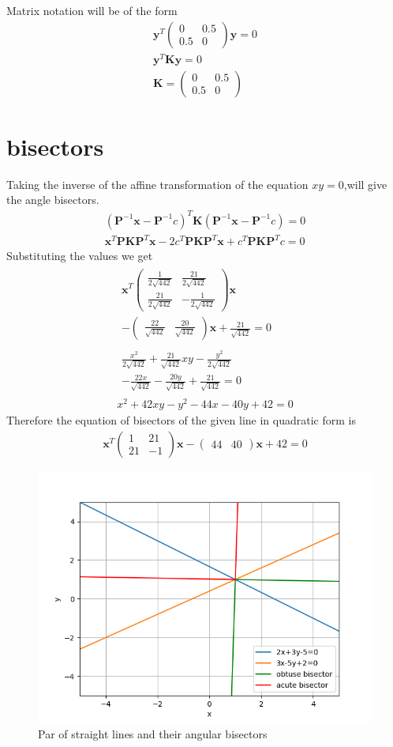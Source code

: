\documentclass[journal,12pt,twocolumn]{IEEEtran}
\providecommand{\brak}[1]{\ensuremath{\left(#1\right)}}
\newcommand{\myvec}[1]{\ensuremath{\begin{pmatrix}#1\end{pmatrix}}}
\numberwithin{equation}{subsection}
\let\vec\mathbf
\begin{document}
Matrix notation will be of the form
\begin{align}
    \vec{y}^T\myvec{0&0.5\\0.5&0}\vec{y}=0\\
    \vec{y}^T\vec{K}\vec{y}=0\\
    \vec{K}=\myvec{0&0.5\\0.5&0}
\end{align}
\section{bisectors}
Taking the inverse of the affine transformation of the equation $xy=0$,will give the angle bisectors.
\begin{align}
    \brak{\vec{P}^{-1}\vec{x}-\vec{P}^{-1}c}^T\vec{K}\brak{\vec{P}^{-1}\vec{x}-\vec{P}^{-1}c}=0\\
    \vec{x}^T\vec{P}\vec{K}\vec{P}^T\vec{x}-2c^T\vec{P}\vec{K}\vec{P}^T\vec{x}+c^T\vec{P}\vec{K}\vec{P}^Tc=0
\end{align}
Substituting the values we get
\begin{align}
    \begin{multlined}
        \vec{x}^T\myvec{\frac{1}{2\sqrt{442}}&\frac{21}{2\sqrt{442}}\\\frac{21}{2\sqrt{442}}&-\frac{1}{2\sqrt{442}}}\vec{x}\\
        -\myvec{\frac{22}{\sqrt{442}}&\frac{20}{\sqrt{442}}}\vec{x}+\frac{21}{\sqrt{442}}=0
    \end{multlined}\\
    \begin{multlined}
        \frac{x^2}{2\sqrt{442}}+\frac{21}{\sqrt{442}}xy-\frac{y^2}{2\sqrt{442}}\\
        -\frac{22x}{\sqrt{442}}-\frac{20y}{\sqrt{442}}+\frac{21}{\sqrt{442}}=0
    \end{multlined}\\
    x^2+42xy-y^2-44x-40y+42=0
\end{align}
Therefore the equation of bisectors of the given line in quadratic form is
\begin{align}
    \vec{x}^T\myvec{1&21\\21&-1}\vec{x}-\myvec{44&40}\vec{x}+42=0
\end{align}
\begin{figure}[t]
    \centering
    \includegraphics[width=\columnwidth]{Fig2_a5.png}
    \caption{Par of straight lines and their angular bisectors}
    \label{fig:my_label}
\end{figure}
\end{document}
